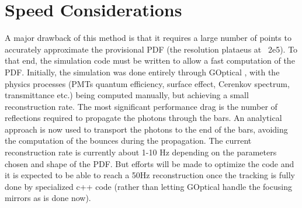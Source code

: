 \documentclass[11pt]{article}
\begin{document}
\section{Speed Considerations}
A major drawback of this method is that it requires a large number of points to accurately approximate the provisional PDF (the resolution plataeus at ~2e5). To that end, the simulation code must be written to allow a fast computation of the PDF.  Initially, the simulation was done entirely through GOptical \cite{goptical}, with the physics processes (PMTs quantum efficiency, surface effect, Cerenkov spectrum, transmittance etc.) being computed manually, but achieving a small reconstruction rate. The most significant performance drag is the number of reflections required to propagate the photons through the bars.  An analytical approach is now used to transport the photons to the end of the bars, avoiding the computation of the bounces during the propagation. The current reconstruction rate is currently about 1-10 Hz depending on the parameters chosen and shape of the PDF. But efforts will be made to optimize the code and it is expected to be able to reach a 50Hz reconstruction once the tracking is fully done by specialized c++ code (rather than letting GOptical handle the focusing mirrors as is done now).


{}

\end{document}
